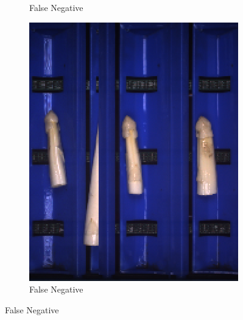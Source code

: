 \begin{figure}[h]
\begin{subfigure}{0.3\textwidth}
		\vspace{-5pt}
		\caption{False Negative}
	\end{subfigure}
	\begin{subfigure}{0.3\textwidth}
		\includegraphics[width=0.9\linewidth]{Figures/appendix/verythin_falsenegative_03.png}
		\vspace{-5pt}
		\caption{False Negative}
	\end{subfigure}


\end{figure}
